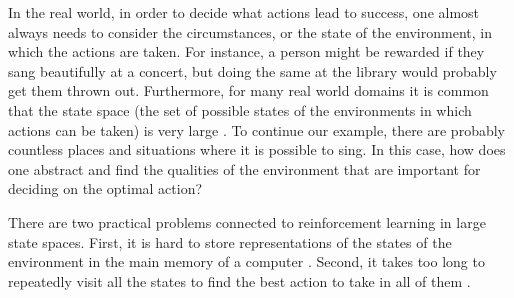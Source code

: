 In the real world, in order to decide what actions lead to success, one almost always needs to consider the circumstances, or the state of the environment, in which the actions are taken. For instance, a person might be rewarded if they sang beautifully at a concert, but doing the same at the library would probably get them thrown out. Furthermore, for many real world domains it is common that the state space (the set of possible states of the environments in which actions can be taken) is very large \parencite{guestrin2003efficient}. To continue our example, there are probably countless places and situations where it is possible to sing. In this case, how does one abstract and find the qualities of the environment that are important for deciding on the optimal action?


There are two practical problems connected to reinforcement learning in large state spaces. First, it is hard to store representations of the states of the environment in the main memory of a computer \parencite{szepesvari2010algorithms}. Second, it takes too long to repeatedly visit all the states to find the best action to take in all of them \parencite{dietterich2013pac}.
